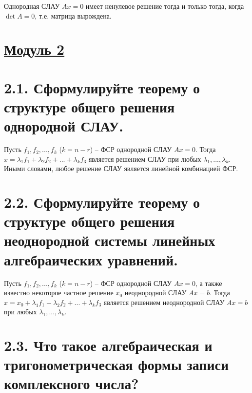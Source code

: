 \documentclass{article}
\begin{document}
Однородная СЛАУ $Ax = 0$ имеет ненулевое решение тогда и только тогда, когда $\det{A} = 0$, т.е. матрица вырождена.

\newpage
{}
\section*{\LARGE\centering \underline{Модуль 2}}

\section*{\LARGE 2.1. Сформулируйте теорему о структуре общего решения однородной СЛАУ.  }

Пусть $f_1, f_2, ..., f_k$ ($k = n - r$) -- ФСР однородной СЛАУ $Ax = 0$. Тогда $x = \lambda_1f_1 + \lambda_2f_2 + ... + \lambda_kf_3$ является решением СЛАУ при любых $\lambda_1, ..., \lambda_k$. Иными словами, любое решение СЛАУ является линейной комбинацией ФСР.

\section*{\LARGE 2.2. Сформулируйте теорему о структуре общего решения неоднородной системы линейных алгебраических уравнений. }

Пусть $f_1, f_2, ..., f_k$ ($k = n - r$) -- ФСР однородной СЛАУ $Ax = 0$, а также известно некоторое частное решение $x_0$ неоднородной СЛАУ $Ax = b$. Тогда $x = x_0 + \lambda_1f_1 + \lambda_2f_2 + ... + \lambda_kf_3$ является решением неоднородной СЛАУ $Ax = b$ при любых $\lambda_1, ..., \lambda_k$.

\section*{\LARGE 2.3. Что такое алгебраическая и тригонометрическая формы записи комплексного числа? }
\end{document}
